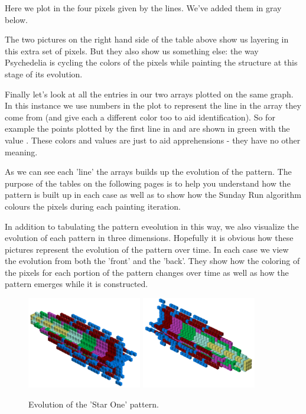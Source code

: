 Here we plot in the four pixels given by the lines. We've added them in gray below. 



The two pictures on the right hand side of the table above show us layering in this extra set of pixels. But they also show us something else:
the way Psychedelia is cycling the colors of the pixels while painting the structure at this stage of its evolution.

Finally let's look at all the entries in our two arrays plotted on the same graph. In this instance we use numbers in the
plot to represent the line in the array they come from (and give each a different color too to aid identification). So
for example the points plotted by the first line in  and  are shown 
in green with the value . These colors and values are just to aid apprehensions - they have no other meaning.

As we can see each 'line' the arrays builds up the evolution of the pattern. The purpose of the tables on the following
pages is to help you understand how the pattern is built up in each case as well as to show how the Sunday Run algorithm
colours the pixels during each painting iteration. 



In addition to tabulating the pattern eveolution in this way, we also visualize the evolution of each pattern in three dimensions. Hopefully it is obvious how these pictures 
represent the evolution of the pattern over time. In each case we view the evolution from both the 'front' and the 'back'.
They show how the coloring of the pixels for each portion of the pattern changes over time as well as how the pattern
emerges while it is constructed.
\begin{figure}[H]
    \centering
    \begin{adjustbox}{width=9cm,center}
      \includegraphics[width=5cm]{src/patterns/pattern0-45.png}%
      \includegraphics[width=5cm]{src/patterns/pattern0-225.png}%
    \end{adjustbox}
\caption{Evolution of the 'Star One' pattern.}
\end{figure}

